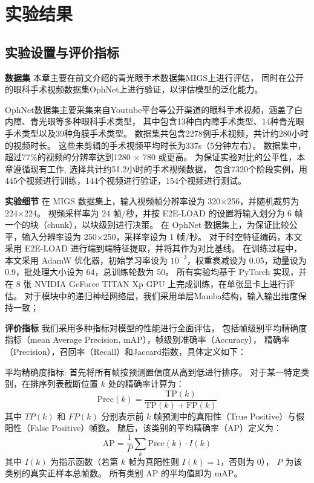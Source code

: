 \FloatBarrier

\section{实验结果}

\subsection{实验设置与评价指标}
\textbf{数据集}\quad
本章主要在前文介绍的青光眼手术数据集MIGS上进行评估，
同时在公开的眼科手术视频数据集OphNet\cite{hu2024ophnet}上进行验证，以评估模型的泛化能力。

OphNet数据集主要采集来自Youtube平台等公开渠道的眼科手术视频，涵盖了白内障、青光眼等多种眼科手术类型，
其中包含13种白内障手术类型、14种青光眼手术类型以及39种角膜手术类型。
数据集共包含2278例手术视频，共计约280小时的视频时长。
这些未剪辑的手术视频平均时长为337s（5分钟左右）。
数据集中，超过77\%的视频的分辨率达到1280 \( \times \) 780 或更高。
为保证实验对比的公平性，本章遵循现有工作\cite{li2025meta, hu2024ophnet}, 
选择共计约51.2小时的手术视频数据，
包含7320个阶段实例，用445个视频进行训练，144个视频进行验证，154个视频进行测试。

\textbf{实验细节}\quad
在 MIGS 数据集上，输入视频帧分辨率设为 320\( \times \)256，并随机裁剪为 224\( \times \)224。
视频采样率为 24 帧/秒，并按 E2E-LOAD\cite{cao2023e2e} 的设置将输入划分为 6 帧一个的块（chunk），以块级别进行决策。
在 OphNet 数据集上，为保证比较公平，输入分辨率设为 250\( \times \)250，采样率设为 1 帧/秒。
对于时空特征编码，本文采用 E2E-LOAD\cite{cao2023e2e} 进行端到端特征提取，并将其作为对比基线。
在训练过程中，本文采用 AdamW 优化器，初始学习率设为 \(10^{-3}\)，权重衰减设为 0.05，动量设为 0.9，批处理大小设为 64，总训练轮数为 50。
所有实验均基于 PyTorch 实现，并在 8 张 NVIDIA GeForce TITAN Xp GPU 上完成训练，在单张显卡上进行评估。
对于\evolution 模块中的递归神经网络层，我们采用单层Mamba结构，输入输出维度保持一致；

\textbf{评价指标}\quad
我们采用多种指标对模型的性能进行全面评估，
包括帧级别平均精确度指标（mean Average Precision, mAP），帧级别准确率（Accuracy），
精确率（Precision），召回率（Recall）和Jaccard指数，具体定义如下：

平均精确度指标: 首先将所有帧按预测置信度从高到低进行排序。
对于某一特定类别，在排序列表截断位置 \(k\) 处的精确率计算为：
\begin{equation}
\text{Prec}(k) = \frac{\text{TP}(k)}{\text{TP}(k) + \text{FP}(k)} 
\end{equation} 
其中 \(TP(k)\) 和 \(FP(k)\) 分别表示前 \(k\) 帧预测中的真阳性（True Positive）与假阳性（False Positive）帧数。
随后，该类别的平均精确率（AP）定义为：
\begin{equation}
\text{AP} = \frac{1}{P} \sum_{k} \text{Prec}(k) \cdot I(k) 
\end{equation} 
其中 \(I(k)\) 为指示函数（若第 \(k\) 帧为真阳性则 \(I(k)=1\)，否则为 \(0\)），
\(P\) 为该类别的真实正样本总帧数。
所有类别 AP 的平均值即为 mAP。

